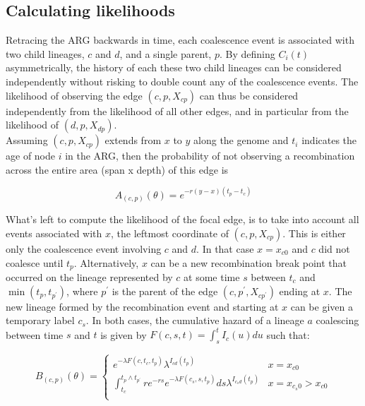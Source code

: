\documentclass{article}
\begin{document}
\subsection{Calculating likelihoods} \label{par:liks}

Retracing the ARG backwards in time, each coalescence event is associated with two child 
lineages, $c$ and $d$, and a single parent, $p$. By defining $C_i(t)$ asymmetrically, 
the history of each these two child lineages can be considered independently without 
risking to double count any of the coalescence events. The likelihood of 
observing the edge $(c, p, X_{cp})$ can thus be considered independently from 
the likelihood of all other edges, and in particular from the likelihood 
of $(d, p, X_{dp})$.\\

Assuming $(c, p, X_{cp})$ extends from $x$ to $y$ along the genome and $t_i$ 
indicates the age of 
node $i$ in the ARG, then the probability of not observing a recombination across the 
entire area (span x depth) of this edge is 

\begin{equation}\label{eq:span}
A_{(c, p)}(\theta) = e^{-r (y-x)(t_p - t_{c})}
\end{equation}

What's left to compute the likelihood of the focal edge, is to take into account 
all events associated with $x$, 
the leftmost coordinate of $(c, p, X_{cp})$. 
This is either only the 
coalescence event involving 
$c$ and $d$. In that case $x=x_{c0}$ and $c$ did not coalesce until $t_p$. 
Alternatively, $x$ can be a new recombination break point that 
occurred on the lineage represented by $c$ at some time $s$ between $t_{c}$ 
and $\min(t_p, t_{p^{\prime}})$, where $p^{\prime}$ is the parent of the 
edge $(c, p^{\prime}, X_{cp^{\prime}})$ ending at $x$. The new lineage formed 
by the recombination event and starting at $x$ can be given a temporary label 
$c_s$. In both cases, the cumulative hazard of a lineage $a$ coalescing 
between time $s$ and $t$ is given by $F(c, s, t) = \int_{s}^{t} I_{c}(u)du$ 
such that:

\begin{equation}\label{eq:depth}
B_{(c, p)}(\theta) = \begin{cases}
e^{-\lambda F(c, t_c, t_p)} \lambda^{I_{cd}(t_p)} & x=x_{c0} \\
\int_{t_c}^{t_{p} \wedge t_{p^{\prime}}} r e^{-rs} e^{-\lambda F(c_s, s, t_{p})} ds \lambda^{I_{c_{s}d}(t_p)} & x=x_{c_{s}0}>x_{c0} \\
\end{cases}
\end{equation}
\end{document}

